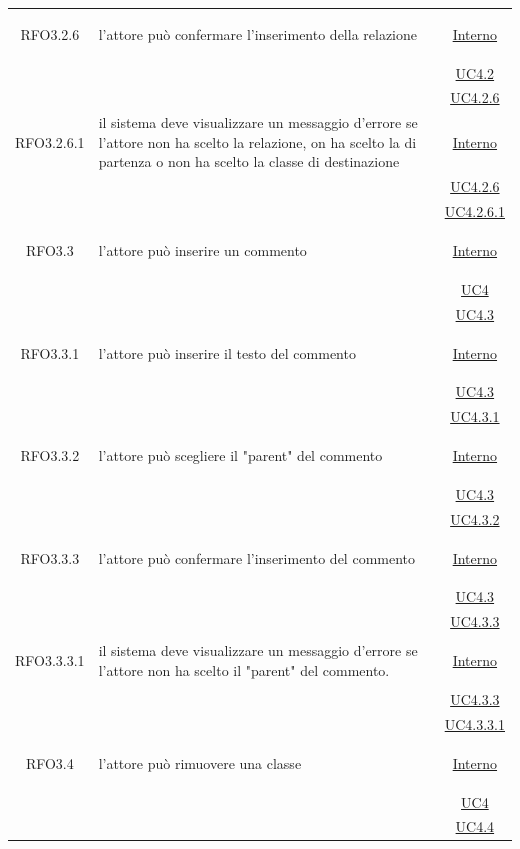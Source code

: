 \begin{longtable}{|c|>{\centering}m{7cm}|c|}
\hypertarget{RFO3.2.6}{RFO3.2.6} & l'attore può confermare l'inserimento della relazione & \hyperlink{Interno}{Interno}\\
& &\hyperref[UC4.2]{UC4.2}\\
& &\hyperref[UC4.2.6]{UC4.2.6}\\ \hline

\hypertarget{RFO3.2.6.1}{RFO3.2.6.1} & il sistema deve visualizzare un messaggio d'errore se l'attore non ha scelto la relazione, on ha scelto la di partenza o non ha scelto la classe di destinazione &  \hyperlink{Interno}{Interno}\\
& &\hyperref[UC4.2.6]{UC4.2.6}\\
& &\hyperref[UC4.2.6.1]{UC4.2.6.1}\\ \hline

\hypertarget{RFO3.3}{RFO3.3} & l'attore può inserire un commento &  \hyperlink{Interno}{Interno}\\
& &\hyperref[UC4]{UC4}\\
& &\hyperref[UC4.3]{UC4.3}\\ \hline

\hypertarget{RFO3.3.1}{RFO3.3.1} & l'attore può inserire il testo del commento & \hyperlink{Interno}{Interno}\\
& &\hyperref[UC4.3]{UC4.3}\\
& &\hyperref[UC4.3.1]{UC4.3.1}\\ \hline

\hypertarget{RFO3.3.2}{RFO3.3.2} & l'attore può scegliere il "parent" del commento & \hyperlink{Interno}{Interno}\\
& &\hyperref[UC4.3]{UC4.3}\\
& &\hyperref[UC4.3.2]{UC4.3.2}\\ \hline

\hypertarget{RFO3.3.3}{RFO3.3.3} & l'attore può confermare l'inserimento del commento & \hyperlink{Interno}{Interno}\\
& &\hyperref[UC4.3]{UC4.3}\\
& &\hyperref[UC4.3.3]{UC4.3.3}\\ \hline

\hypertarget{RFO3.3.3.1}{RFO3.3.3.1} & il sistema deve visualizzare un messaggio d'errore se l'attore non ha scelto il "parent" del commento. & \hyperlink{Interno}{Interno}\\
& &\hyperref[UC4.3.3]{UC4.3.3}\\
& &\hyperref[UC4.3.3.1]{UC4.3.3.1}\\ \hline

\hypertarget{RFO3.4}{RFO3.4} & l'attore può rimuovere una classe &  \hyperlink{Interno}{Interno}\\
& &\hyperref[UC4]{UC4}\\
& &\hyperref[UC4.4]{UC4.4}\\ \hline


\end{longtable}
